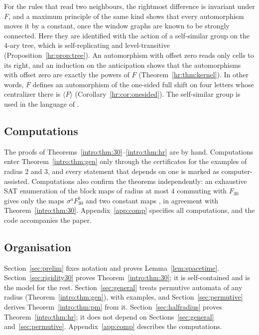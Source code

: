 \documentclass[11pt]{amsart}
\theoremstyle{definition}
\theoremstyle{remark}
\newcommand{\sh}{\sigma}
\begin{document}
For the rules that read two neighbours, the rightmost difference is invariant under $F$, and a maximum principle of the same kind shows that every automorphism moves it by a constant, once the window graphs are known to be strongly connected. Here they are identified with the action of a self-similar group on the $4$-ary tree, which is self-replicating and level-transitive (Proposition~\ref{hr:prop:tree}). An automorphism with offset zero reads only cells to its right, and an induction on the anticipation shows that the automorphisms with offset zero are exactly the powers of $F$ (Theorem~\ref{hr:thm:kernel}). In other words, $F$ defines an automorphism of the one-sided full shift on four letters \cite{BFK1990} whose centralizer there is $\langle F\rangle$ (Corollary~\ref{hr:cor:onesided}). The self-similar group is used in the language of \cite{Nekrashevych2005}.

\subsection*{Computations}
The proofs of Theorems~\ref{intro:thm:30}--\ref{intro:thm:hr} are by hand. Computations enter Theorem~\ref{intro:thm:gen} only through the certificates for the examples of radius $2$ and $3$, and every statement that depends on one is marked as computer-assisted. Computations also confirm the theorems independently: an exhaustive SAT enumeration of the block maps of radius at most $4$ commuting with $F_{30}$ gives only the maps $\sh^aF_{30}^b$ and two constant maps \cite{PaperD}, in agreement with Theorem~\ref{intro:thm:30}. Appendix~\ref{app:comp} specifies all computations, and the code accompanies the paper.

\subsection*{Organisation}
Section~\ref{sec:prelim} fixes notation and proves Lemma~\ref{lem:spacetime}. Section~\ref{sec:rigidity30} proves Theorem~\ref{intro:thm:30}; it is self-contained and is the model for the rest. Section~\ref{sec:general} treats permutive automata of any radius (Theorem~\ref{intro:thm:gen}), with examples, and Section~\ref{sec:permutive} derives Theorem~\ref{intro:thm:pm} from it. Section~\ref{sec:halfradius} proves Theorem~\ref{intro:thm:hr}; it does not depend on Sections~\ref{sec:general} and~\ref{sec:permutive}. Appendix~\ref{app:comp} describes the computations.
\end{document}
